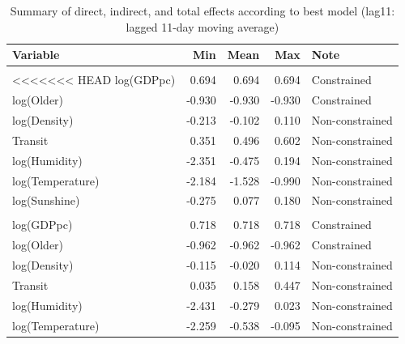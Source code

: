 \documentclass[]{elsarticle} %
\begin{document}
\begin{table}

\caption{\label{tab:summary-impacts-best-model}\label{tab:summary-impacts-best-model}Summary of direct, indirect, and total effects according to best model (lag11: lagged 11-day moving average)}
\centering
\begin{tabular}[t]{lrrrl}
\toprule
Variable & Min & Mean & Max & Note\\
\midrule
\rowcolor{gray!6}  \addlinespace[0.3em]
\multicolumn{5}{l}{\textbf{Direct Effects}}\\
<<<<<<< HEAD
\hspace{1em}log(GDPpc) & 0.694 & 0.694 & 0.694 & Constrained\\
\hspace{1em}log(Older) & -0.930 & -0.930 & -0.930 & Constrained\\
\rowcolor{gray!6}  \hspace{1em}log(Density) & -0.213 & -0.102 & 0.110 & Non-constrained\\
\hspace{1em}Transit & 0.351 & 0.496 & 0.602 & Non-constrained\\
\rowcolor{gray!6}  \hspace{1em}log(Humidity) & -2.351 & -0.475 & 0.194 & Non-constrained\\
\hspace{1em}log(Temperature) & -2.184 & -1.528 & -0.990 & Non-constrained\\
\rowcolor{gray!6}  \hspace{1em}log(Sunshine) & -0.275 & 0.077 & 0.180 & Non-constrained\\
\addlinespace[0.3em]
\multicolumn{5}{l}{\textbf{Indirect Effects}}\\
\hspace{1em}log(GDPpc) & 0.718 & 0.718 & 0.718 & Constrained\\
\rowcolor{gray!6}  \hspace{1em}log(Older) & -0.962 & -0.962 & -0.962 & Constrained\\
\hspace{1em}log(Density) & -0.115 & -0.020 & 0.114 & Non-constrained\\
\rowcolor{gray!6}  \hspace{1em}Transit & 0.035 & 0.158 & 0.447 & Non-constrained\\
\hspace{1em}log(Humidity) & -2.431 & -0.279 & 0.023 & Non-constrained\\
\rowcolor{gray!6}  \hspace{1em}log(Temperature) & -2.259 & -0.538 & -0.095 & Non-constrained\\

\end{tabular}
\end{table}
\end{document}
